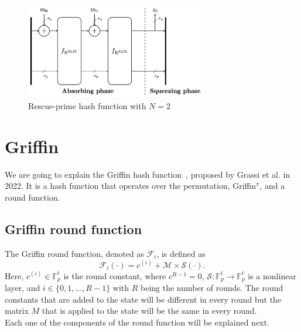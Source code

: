 \begin{figure}
    \centering
    \includegraphics[width=0.7\textwidth]{graphics/rescue-prime-hash.png}
    \caption{Rescue-prime hash function with $N=2$~\cite{szepieniec2020rescue}}
    \label{fig:rescue-prime-hash}
\end{figure}

\section{Griffin}
\label{sec:griffin}
We are going to explain the Griffin hash function~\cite{grassi2022horst}, proposed by Grassi et al. in 2022. It is a hash function that operates over the permutation, Griffin$^\pi$, and a round function.

\subsection*{Griffin round function}
The Griffin round function, denoted as $\mathcal{F}_i$, is defined as
\begin{equation}
    \mathcal{F}_i(\cdot) = c^{(i)} + \mathcal{M} \times \mathcal{S}(\cdot).
\end{equation}
Here, $c^{(i)} \in \mathbb{F}_{p}^t$ is the round constant, where $c^{R-1} = 0$, $\mathcal{S} : \mathbb{F}_{p}^t \longrightarrow \mathbb{F}_{p}^t$ is a nonlinear layer, and $i \in \{0,1,\dots,R-1\}$ with $R$ being the number of rounds. The round constants that are added to the state will be different in every round but the matrix $M$ that is applied to the state will be the same in every round.\\
Each one of the components of the round function will be explained next.

